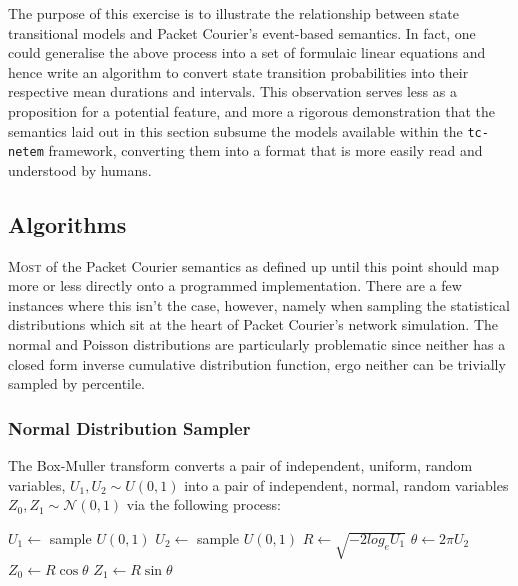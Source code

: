 The purpose of this exercise is to illustrate the relationship between state transitional models and Packet Courier's
event-based semantics. In fact, one could generalise the above process into a set of formulaic linear equations and
hence write an algorithm to convert state transition probabilities into their respective mean durations and
intervals. This observation serves less as a proposition for a potential feature, and more a rigorous demonstration
that the semantics laid out in this section subsume the models available within the \texttt{tc-netem} framework,
converting them into a format that is more easily read and understood by humans.

\newpage

\subsection{Algorithms}\label{subsection:algorithms}

\lettrine{M}{ost} of the Packet Courier semantics as defined up until this point should map more or less directly onto a
programmed implementation. There are a few instances where this isn't the case, however, namely when sampling the
statistical distributions which sit at the heart of Packet Courier's network simulation. The normal and Poisson
distributions are particularly problematic since neither has a closed form inverse cumulative distribution function,
ergo neither can be trivially sampled by percentile.

\subsubsection{Normal Distribution Sampler}\label{subsubsection:normal_distribution_sampler}

The Box-Muller transform converts a pair of independent, uniform, random variables, $U_1, U_2 \sim U(0, 1)$ into a pair
of independent, normal, random variables $Z_0, Z_1 \sim \mathcal{N}(0, 1)$\cite{box_muller_transform} via the
following process: \\

\begin{algorithm}[caption={Box-Muller Transform\cite{box_muller_transform}.},label={alg:box_muller_transform},
    captionpos=b]
    $U_1 \gets$ sample $U(0, 1)$
    $U_2 \gets$ sample $U(0, 1)$
    $R \gets \sqrt{-2 log_e U_1}$
    $\theta \gets 2 \pi U_2$
    $Z_0 \gets R \cos \theta$
    $Z_1 \gets R \sin \theta$
\end{algorithm}

